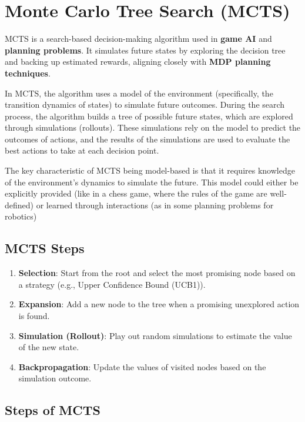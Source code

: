 \documentclass[
]{book}
\providecommand{\tightlist}{%
  \setlength{\itemsep}{0pt}\setlength{\parskip}{0pt}}
\begin{document}
\section{\texorpdfstring{\textbf{Monte Carlo Tree Search (MCTS)}}{Monte Carlo Tree Search (MCTS)}}\label{monte-carlo-tree-search-mcts}

MCTS is a search-based decision-making algorithm used in \textbf{game AI} and \textbf{planning problems}. It simulates future states by exploring the decision tree and backing up estimated rewards, aligning closely with \textbf{MDP planning techniques}.

In MCTS, the algorithm uses a model of the environment (specifically, the transition dynamics of states) to simulate future outcomes. During the search process, the algorithm builds a tree of possible future states, which are explored through simulations (rollouts). These simulations rely on the model to predict the outcomes of actions, and the results of the simulations are used to evaluate the best actions to take at each decision point.

The key characteristic of MCTS being model-based is that it requires knowledge of the environment's dynamics to simulate the future. This model could either be explicitly provided (like in a chess game, where the rules of the game are well-defined) or learned through interactions (as in some planning problems for robotics)

\subsection{\texorpdfstring{\textbf{MCTS Steps}}{MCTS Steps}}\label{mcts-steps}

\begin{enumerate}
\def\labelenumi{\arabic{enumi}.}
\tightlist
\item
  \textbf{Selection}: Start from the root and select the most promising node based on a strategy (e.g., Upper Confidence Bound (UCB1)).
\item
  \textbf{Expansion}: Add a new node to the tree when a promising unexplored action is found.
\item
  \textbf{Simulation (Rollout)}: Play out random simulations to estimate the value of the new state.
\item
  \textbf{Backpropagation}: Update the values of visited nodes based on the simulation outcome.
\end{enumerate}

\subsection{Steps of MCTS}\label{steps-of-mcts}
\end{document}
